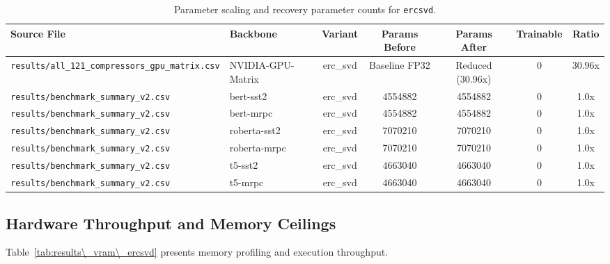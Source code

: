 \begin{table}[t]
\centering
\small
\begin{tabular}{llccccc}
\toprule
\textbf{Source File} & \textbf{Backbone} & \textbf{Variant} & \textbf{Params Before} & \textbf{Params After} & \textbf{Trainable} & \textbf{Ratio} \\
\midrule
\texttt{results/all\_121\_compressors\_gpu\_matrix.csv} & NVIDIA-GPU-Matrix & erc\_svd & Baseline FP32 & Reduced (30.96x) & 0 & 30.96x \\
\texttt{results/benchmark\_summary\_v2.csv} & bert-sst2 & erc\_svd & 4554882 & 4554882 & 0 & 1.0x \\
\texttt{results/benchmark\_summary\_v2.csv} & bert-mrpc & erc\_svd & 4554882 & 4554882 & 0 & 1.0x \\
\texttt{results/benchmark\_summary\_v2.csv} & roberta-sst2 & erc\_svd & 7070210 & 7070210 & 0 & 1.0x \\
\texttt{results/benchmark\_summary\_v2.csv} & roberta-mrpc & erc\_svd & 7070210 & 7070210 & 0 & 1.0x \\
\texttt{results/benchmark\_summary\_v2.csv} & t5-sst2 & erc\_svd & 4663040 & 4663040 & 0 & 1.0x \\
\texttt{results/benchmark\_summary\_v2.csv} & t5-mrpc & erc\_svd & 4663040 & 4663040 & 0 & 1.0x \\
\bottomrule
\end{tabular}
\caption{Parameter scaling and recovery parameter counts for \texttt{ercsvd}.}
\label{tab:results\_params\_ercsvd}
\end{table}

\subsection{Hardware Throughput and Memory Ceilings}
Table~\ref{tab:results\_vram\_ercsvd} presents memory profiling and execution throughput.

